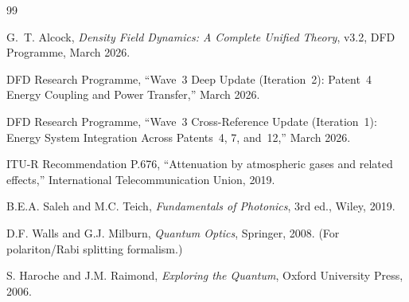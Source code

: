 \documentclass[aps,prd,twocolumn,superscriptaddress]{revtex4-2}
\begin{document}
\begin{thebibliography}{99}

G.~T. Alcock, \textit{Density Field Dynamics: A Complete Unified Theory},
v3.2, DFD Programme, March 2026.

DFD Research Programme, ``Wave~3 Deep Update (Iteration~2): Patent~4
Energy Coupling and Power Transfer,'' March 2026.

DFD Research Programme, ``Wave~3 Cross-Reference Update (Iteration~1):
Energy System Integration Across Patents~4, 7, and~12,'' March 2026.

ITU-R Recommendation P.676, ``Attenuation by atmospheric gases and
related effects,'' International Telecommunication Union, 2019.

B.E.A. Saleh and M.C. Teich, \textit{Fundamentals of Photonics},
3rd ed., Wiley, 2019.

D.F. Walls and G.J. Milburn, \textit{Quantum Optics}, Springer, 2008.
(For polariton/Rabi splitting formalism.)

S. Haroche and J.M. Raimond, \textit{Exploring the Quantum},
Oxford University Press, 2006.

\end{thebibliography}
\end{document}
